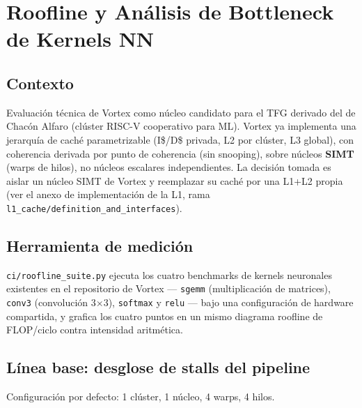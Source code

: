 \section{Roofline y Análisis de Bottleneck de Kernels NN}
\label{sec:roofline_bottleneck}

\subsection{Contexto}

Evaluación técnica de Vortex como núcleo candidato para el TFG derivado del
de Chacón Alfaro (clúster RISC-V cooperativo para ML). Vortex ya implementa
una jerarquía de caché parametrizable (I\$/D\$ privada, L2 por clúster, L3
global), con coherencia derivada por punto de coherencia (sin snooping),
sobre núcleos \textbf{SIMT} (warps de hilos), no núcleos escalares
independientes. La decisión tomada es aislar un núcleo SIMT de Vortex y
reemplazar su caché por una L1+L2 propia (ver el anexo de implementación
de la L1, rama \texttt{l1\_cache/definition\_and\_interfaces}).

\subsection{Herramienta de medición}

\texttt{ci/roofline\_suite.py} ejecuta los cuatro benchmarks de kernels
neuronales existentes en el repositorio de Vortex --- \texttt{sgemm}
(multiplicación de matrices), \texttt{conv3} (convolución 3$\times$3),
\texttt{softmax} y \texttt{relu} --- bajo una configuración de hardware
compartida, y grafica los cuatro puntos en un mismo diagrama roofline de
FLOP/ciclo contra intensidad aritmética.

\subsection{Línea base: desglose de stalls del pipeline}
\label{ssec:linea_base}

Configuración por defecto: 1 clúster, 1 núcleo, 4 warps, 4 hilos.

